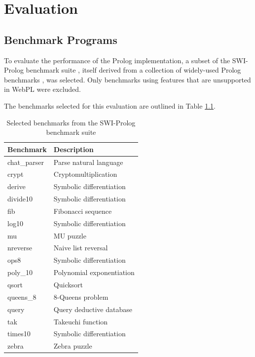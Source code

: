 \chapter{Evaluation}


\section{Benchmark Programs}

To evaluate the performance of the Prolog implementation, a subset of the SWI-Prolog benchmark suite \cite{wielemakerSWIPrologbenchmarksuite2025}, itself derived from a collection of widely-used Prolog benchmarks \cite{haygoodPrologBenchmarkSuite1989}, was selected. Only benchmarks using features that are unsupported in WebPL were excluded.

The benchmarks selected for this evaluation are outlined in Table \ref{tab:benchmarks}.

\begin{table}[H]
\centering
\begin{tabular}{ll}
\hline
\textbf{Benchmark} & \textbf{Description} \\
\hline
chat\_parser & Parse natural language \\
crypt & Cryptomultiplication \\
derive & Symbolic differentiation \\
divide10 & Symbolic differentiation \\
fib & Fibonacci sequence \\
log10 & Symbolic differentiation \\
mu & MU puzzle \\
nreverse & Naive list reversal \\
ops8 & Symbolic differentiation \\
poly\_10 & Polynomial exponentiation \\
qsort & Quicksort \\
queens\_8 & 8-Queens problem \\
query & Query deductive database \\
tak & Takeuchi function \\
times10 & Symbolic differentiation \\
zebra & Zebra puzzle \\
\hline
\end{tabular}
\caption{Selected benchmarks from the SWI-Prolog benchmark suite}
\label{tab:benchmarks}
\end{table}

